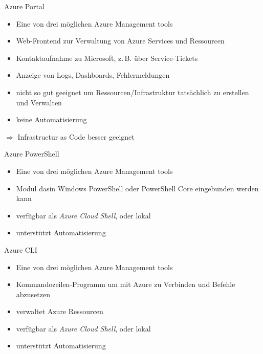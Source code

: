 
\begin{flashcard}[\ ]{Azure Portal}
    \begin{itemize}
        \item Eine von drei möglichen Azure Management tools
        \item Web-Frontend zur Verwaltung von Azure Services und Ressourcen
        \item Kontaktaufnahme zu Microsoft, z.\,B. über Service-Tickets
        \item Anzeige von Logs, Dashboards, Fehlermeldungen
        \item nicht so gut geeignet um Ressourcen/Infrastruktur tatsächlich zu erstellen und Verwalten
        \item keine Automatisierung
    \end{itemize}
    $\Rightarrow$ Infrastructur as Code besser geeignet

\end{flashcard}

\begin{flashcard}[\ ]{Azure PowerShell}
    \begin{itemize}
        \item Eine von drei möglichen Azure Management tools
        \item Modul dasin Windows PowerShell oder PowerShell Core eingebunden werden kann
        \item verfügbar als \emph{Azure Cloud Shell}, oder lokal
        \item unterstützt Automatisierung
    \end{itemize}
\end{flashcard}

\begin{flashcard}[Definition]{Azure CLI}
    \begin{itemize}
        \item Eine von drei möglichen Azure Management tools
        \item Kommandozeilen-Programm um mit Azure zu Verbinden und Befehle abzusetzen
        \item verwaltet Azure Ressourcen
        \item verfügbar als \emph{Azure Cloud Shell}, oder lokal
        \item unterstützt Automatisierung
    \end{itemize}
\end{flashcard}

